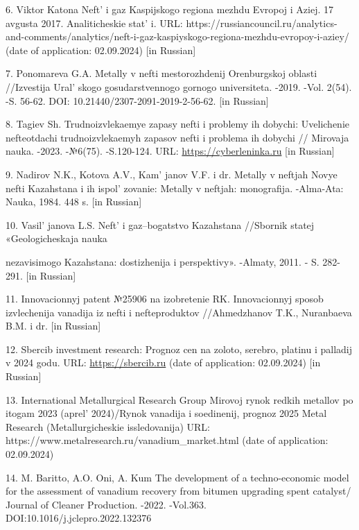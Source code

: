 \begin{references}
6. Viktor Katona Neft'{} i gaz Kaspijskogo regiona mezhdu
Evropoj i Aziej. 17 avgusta 2017. Analiticheskie stat' i.
URL:
https://russiancouncil.ru/analytics-and-comments/analytics/neft-i-gaz-kaspiyskogo-regiona-mezhdu-evropoy-i-aziey/
(date of application: 02.09.2024) {[}in Russian{]}

7. Ponomareva G.A. Metally v nefti mestorozhdenij Orenburgskoj oblasti
//Izvestija Ural' skogo \linebreak gosudarstvennogo gornogo
universiteta. -2019. -Vol. 2(54). -S. 56-62. DOI:
10.21440/2307-2091-2019-2-56-62. {[}in Russian{]}

8. Tagiev Sh. Trudnoizvlekaemye zapasy nefti i problemy ih dobychi:
Uvelichenie nefteotdachi \linebreak trudnoizvlekaemyh zapasov nefti i problema ih
dobychi // Mirovaja nauka. -2023. -№6(75). -S.120-124. URL:
\href{https://cyberleninka.ru/article/n/trudnoizvlekaemye-zapasy-nefti-i-problemy-ih-dobychi-uvelechenie-nefteotdachi-trudnoizvlekaemyh-zapasov-nefti-i-problema-ih-dobychi/viewer}{https://cyberleninka.ru}
{[}in Russian{]}

9. Nadirov N.K., Kotova A.V., Kam' janov V.F. i dr.
Metally v neftjah Novye nefti Kazahstana i ih
ispol' zovanie: Metally v neftjah: monografija.
-Alma-Ata: Nauka, 1984. 448 s. {[}in Russian{]}

10. Vasil' janova L.S. Neft'{} i
gaz--bogatstvo Kazahstana //Sbornik statej «Geologicheskaja nauka

nezavisimogo Kazahstana: dostizhenija i perspektivy». -Almaty, 2011. -
S. 282-291. {[}in Russian{]}

11. Innovacionnyj patent №25906 na izobretenie RK. Innovacionnyj sposob
izvlechenija vanadija iz nefti i nefteproduktov //Ahmedzhanov T.K.,
Nuranbaeva B.M. i dr. {[}in Russian{]}

12. Sbercib investment research: Prognoz cen na zoloto, serebro, platinu
i palladij v 2024 godu. URL:
\href{https://sbercib.ru/publication/prognoz-tsen-na-zoloto-serebro-platinu-i-palladii-v-2024-godu}{https://sbercib.ru}
(date of application: 02.09.2024) {[}in Russian{]}

13. International Metallurgical Research Group Mirovoj rynok redkih
metallov po itogam 2023 (aprel'{} 2024)/Rynok vanadija i
soedinenij, prognoz 2025 Metal Research (Metallurgicheskie
issledovanija) URL: https://www.metalresearch.ru/vanadium\_market.html
(date of application: 02.09.2024)

14. M. Baritto, A.O. Oni, A. Kum The development of a techno-economic
model for the assessment of vanadium recovery from bitumen upgrading
spent catalyst/ Journal of Cleaner Production. -2022. -Vol.363.
DOI:10.1016/j.jclepro.2022.132376


\end{references}
